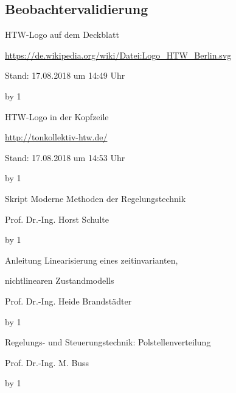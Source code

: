\documentclass[
	pagesize,
	fontsize=12pt,
	paper=a4,
	oneside,
   reqno
]{scrartcl}
\begin{document}
\subsection{Beobachtervalidierung}

\newpage
\newcount\Quellennummer
{}

\renewcommand\refname{Literaturverzeichnis}

\begin{thebibliography}{999}
{\setlength{\emergencystretch}{3cm}%

HTW-Logo auf dem Deckblatt\par
\url{https://de.wikipedia.org/wiki/Datei:Logo_HTW_Berlin.svg} \par
 Stand: 17.08.2018 um 14:49 Uhr

\advance\Quellennummer by 1
 
HTW-Logo in der Kopfzeile\par
\url{http://tonkollektiv-htw.de/} \par
 Stand: 17.08.2018 um 14:53 Uhr

\advance\Quellennummer by 1

Skript Moderne Methoden der Regelungstechnik\par
Prof.\xspace Dr.\xspace -Ing.\xspace Horst Schulte

\advance\Quellennummer by 1

Anleitung Linearisierung eines zeitinvarianten,\par
nichtlinearen Zustandmodells\par
Prof.\xspace Dr.\xspace -Ing.\xspace Heide Brandstädter

\advance\Quellennummer by 1

Regelungs- und Steuerungstechnik: Polstellenverteilung\par
Prof.\xspace Dr.\xspace -Ing.\xspace M. Buss

\advance\Quellennummer by 1

}
\end{thebibliography}
\end{document}
